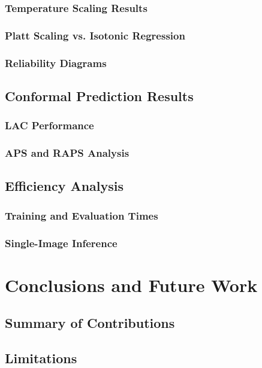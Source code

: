 \documentclass[12pt,a4paper]{book}
\theoremstyle{definition}
\theoremstyle{remark}
\begin{document}
\subsection{Temperature Scaling Results}
\subsection{Platt Scaling vs. Isotonic Regression}
\subsection{Reliability Diagrams}

\section{Conformal Prediction Results}\label{sec:conformal-results}
\subsection{LAC Performance}
\subsection{APS and RAPS Analysis}

\section{Efficiency Analysis}\label{sec:efficiency}
\subsection{Training and Evaluation Times}
\subsection{Single-Image Inference}


\chapter{Conclusions and Future Work}\label{chap:conclusions}

\section{Summary of Contributions}\label{sec:summary}

\section{Limitations}\label{sec:limitations}
\end{document}
